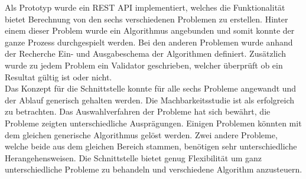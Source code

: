 Als Prototyp wurde ein REST API implementiert, welches die Funktionalität bietet Berechnung von den sechs verschiedenen Problemen zu erstellen. Hinter einem dieser Problem wurde ein 
Algorithmus angebunden und somit konnte der ganze Prozess durchgespielt werden. Bei den anderen Problemen wurde anhand der Recherche Ein- und Ausgabeschema der Algorithmen definiert. 
Zusätzlich wurde zu jedem Problem ein Validator geschrieben, welcher überprüft ob ein Resultat gültig ist oder nicht.\\

Das Konzept für die Schnittstelle konnte für alle sechs Probleme angewandt und der Ablauf generisch gehalten werden. Die Machbarkeitsstudie ist als erfolgreich zu betrachten. Das 
Auswahlverfahren der Probleme hat sich bewährt, die Probleme zeigten unterschiedliche Ausprägungen. Einigen Problemen könnten mit dem gleichen generische Algorithmus gelöst werden. Zwei 
andere Probleme, welche beide aus dem gleichen Bereich stammen, benötigen sehr unterschiedliche Herangehensweisen. Die Schnittstelle bietet genug Flexibilität um ganz unterschiedliche 
Probleme zu behandeln und verschiedene Algorithm anzusteuern.